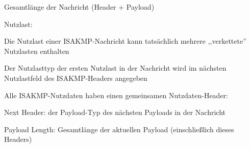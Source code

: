 \documentclass[a4paper]{article}
\begin{document}
\begin{multicols}{3}
\begin{itemize*}
\begin{itemize*}
                  \item Gesamtlänge der Nachricht (Header + Payload)
            \end{itemize*}
            \item Nutzlast:
            \begin{itemize*}
                  \item Die Nutzlast einer ISAKMP-Nachricht kann tatsächlich mehrere ,,verkettete'' Nutzlasten enthalten
                  \item Der Nutzlasttyp der ersten Nutzlast in der Nachricht wird im nächsten Nutzlastfeld des ISAKMP-Headers angegeben
                  \item Alle ISAKMP-Nutzdaten haben einen gemeinsamen Nutzdaten-Header:
                  \begin{itemize*}
                        \item Next Header: der Payload-Typ des nächsten Payloads in der Nachricht
                        \item Payload Length: Gesamtlänge der aktuellen Payload (einschließlich dieses Headers)
                  \end{itemize*}
            \end{itemize*}
      \end{itemize*}



\end{multicols}
\end{document}
